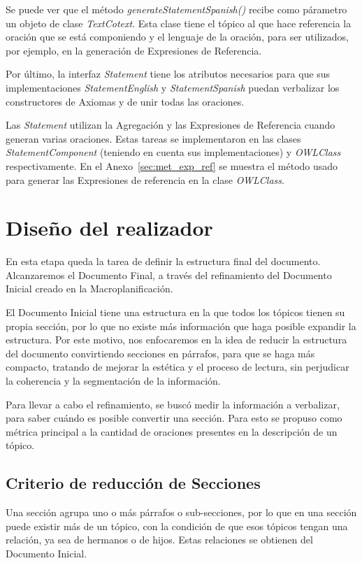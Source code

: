 Se puede ver que el método \emph{generateStatementSpanish()} recibe como párametro un objeto de clase \emph{TextCotext}. Esta clase tiene el tópico al que hace referencia la oración que se está componiendo y el lenguaje de la oración, para ser utilizados, por ejemplo, en la generación de Expresiones de Referencia.

Por último, la interfaz \emph{Statement} tiene los atributos necesarios para que sus implementaciones \emph{StatementEnglish} y \emph{StatementSpanish} puedan verbalizar los constructores de Axiomas y de unir todas las oraciones. 

Las \emph{Statement} utilizan la Agregación y las Expresiones de Referencia cuando generan varias oraciones. Estas tareas se implementaron en las clases \emph{StatementComponent} (teniendo en cuenta sus implementaciones) y \emph{OWLClass} respectivamente. En el Anexo~\ref{sec:met_exp_ref} se muestra el método usado para generar las Expresiones de referencia en la clase \emph{OWLClass}.


\section{Diseño del realizador}
En esta etapa queda la tarea de definir la estructura final del documento. 
Alcanzaremos el Documento Final, a través del refinamiento del Documento Inicial creado en la Macroplanificación.

El Documento Inicial tiene una estructura en la que todos los tópicos tienen su propia sección, por lo que no existe más información que haga posible expandir la estructura. Por este motivo, nos enfocaremos en la idea de reducir la estructura del documento convirtiendo secciones en párrafos, para que se haga más compacto, tratando de mejorar la estética y el proceso de lectura, sin perjudicar la coherencia y la segmentación de la información.

Para llevar a cabo el refinamiento, se buscó medir la información a verbalizar, para saber cuándo es posible convertir una sección. Para esto se propuso como métrica principal a la cantidad de oraciones presentes en la descripción de un tópico.

\subsection{Criterio de reducción de Secciones}
Una sección agrupa uno o más párrafos o sub-secciones, por lo que en una sección puede existir más de un tópico, con la condición de que esos tópicos tengan una relación, ya sea de hermanos o de hijos. Estas relaciones se obtienen del Documento Inicial. 

